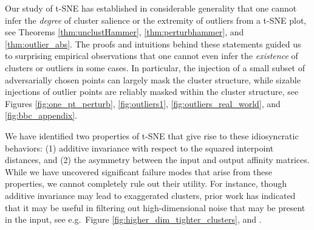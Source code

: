 Our %
study of t-SNE has established in considerable generality that one cannot infer the \textit{degree} of cluster salience or the extremity of outliers from a t-SNE plot, see Theorems \ref{thm:unclustHammer}, \ref{thm:perturbhammer}, and \ref{thm:outlier_abs}. The proofs and intuitions behind these statements guided us to surprising empirical observations that one cannot even infer the \textit{existence} of clusters or outliers in some cases. In particular, the injection of a small subset of adversarially chosen points can largely mask the cluster structure, while sizable injections of outlier points are reliably masked within the cluster structure, 
see Figures \ref{fig:one_pt_perturb}, \ref{fig:outliers1}, \ref{fig:outliers_real_world}, and \ref{fig:bbc_appendix}. %



We have identified two properties of t-SNE that give rise to these idiosyncratic behaviors: (1) additive invariance with respect to the squared interpoint distances, and (2) the asymmetry between the input and output affinity matrices. %
 While we have uncovered significant failure modes that arise from these properties, we cannot completely rule out their utility. {For instance, though additive invariance may lead to exaggerated clusters, prior work has indicated that it may be useful in filtering out high-dimensional noise that may be present in the input, see e.g.\ Figure \ref{fig:higher_dim_tighter_clusters}, and \citet{lee2011, lee2014, Karoui2010, Kaouri2015, Landa2023}}.


